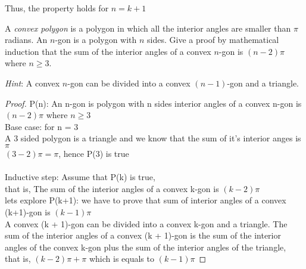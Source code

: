 \documentclass[a4paper]{exam}
\begin{document}
\begin{questions}
\begin{parts}
\begin{solution}
Thus, the property holds for $n=k+1$
    \end{solution}
  \end{parts}

\question A \textit{convex polygon} is a polygon in which all the interior angles are smaller than $\pi$ radians. An $n$-gon is a polygon with $n$ sides. Give a proof by mathematical induction that the sum of the interior angles of a convex $n$-gon is $(n-2)\pi$ where $n\ge 3$. 

  \textit{Hint}: A convex $n$-gon can be divided into a convex $(n-1)$-gon and a triangle.
  \begin{solution}
    \begin{proof}
      P(n): An n-gon is polygon with n sides interior angles of a convex n-gon is $(n - 2) \pi$ where $n \ge 3$\\
      Base case: for n = 3\\
      A 3 sided polygon is a triangle and we know that the sum of it's interior anges is $\pi$\\
      $(3-2)\pi = \pi$, hence P(3) is true\\\\
      Inductive step: Assume that P(k) is true,\\
      that is, The sum of the interior angles of a convex k-gon is $(k - 2)\pi$\\
      lets explore P(k+1): we have to prove that sum of interior angles of a convex (k+1)-gon is $(k - 1) \pi$\\
      A convex (k + 1)-gon can be divided into a convex k-gon and a triangle. The sum of
      the interior angles of a convex (k + 1)-gon is the sum of the interior angles of the convex
      k-gon plus the sum of the interior angles of the triangle,\\
      that is, $(k-2)\pi + \pi$ which is equals to $(k-1)\pi$

    \end{proof}
  \end{solution}
  

\end{questions}
\end{document}
